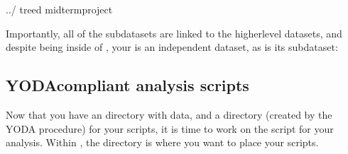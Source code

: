 \begin{sphinxVerbatim}[commandchars=\\\{\}]
../
tree\PYGZhy{}d
midterm\PYGZus{}project

\end{sphinxVerbatim}

\sphinxAtStartPar
Importantly, all of the subdatasets are linked to the higher\sphinxhyphen{}level datasets,
and despite being inside of , your  is an independent
dataset, as is its  subdataset:

\begin{figure}[tbp]
\centering

\noindent{}
\end{figure}


\subsection{YODA\sphinxhyphen{}compliant analysis scripts}
\label{\detokenize{basics/101-130-yodaproject:yoda-compliant-analysis-scripts}}
\sphinxAtStartPar
Now that you have an  directory with data, and a  directory
(created by the YODA procedure) for your scripts, it is time to work on the script
for your analysis. Within , the  directory is where
you want to place your scripts.

